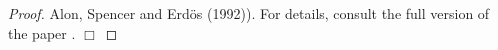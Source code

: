 \documentclass[10pt]{llncs}
\newcommand{\PROB}{\Pr}
\newcommand{\EXP}{\mathrm{E}}
\begin{document}
\begin{proof}
Alon, Spencer and Erd\"os (1992)). 
For details, consult the full version of the paper \cite{dgm09}.
\hfill$\Box$\end{proof}

\end{document}
